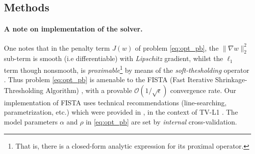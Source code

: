 \subsection{Methods}


\paragraph{A note on implementation of the solver.}
One notes that in the penalty term $J(w)$ of problem
\eqref{eq:opt_pb}, the $\|\nabla
w\|^2_2$ sub-term is smooth (i.e differentiable) with
\textit{Lipschitz} gradient, whilst the $\ell_{1}$ term though
nonsmooth, is \textit{proximable}\footnote{That is, there is a
  closed-form analytic expression for its proximal operator.} by means
of the \textit{soft-thesholding} operator \citep{daubechies2004}.  Thus
problem \eqref{eq:opt_pb} is amenable to the FISTA (Fast Iterative
Shrinkage-Thresholding Algorithm) \citep{beck09fista}, with a provable
$\mathcal{O}(1/\sqrt{\epsilon})$ convergence rate. Our implementation
of FISTA uses technical recommendations
(line-searching, parametrization, etc.) which were provided in
\citep{dohmatob2014benchmarking}, in the context of TV-L1
\citep{baldassarre2012,gramfort2013}. The model parameters $\alpha$ and
$\rho$ in \eqref{eq:opt_pb} are set by \textit{internal}
cross-validation.




